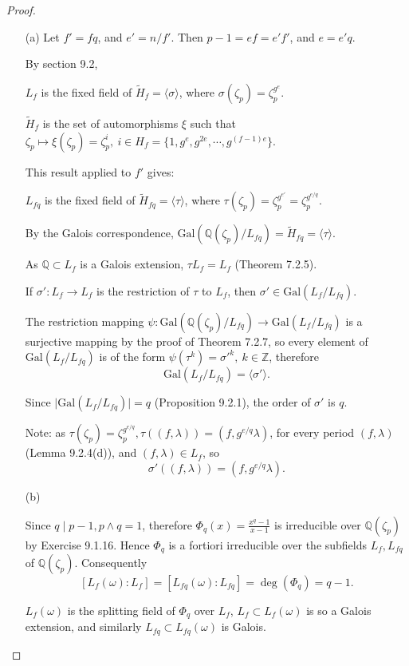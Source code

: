 \documentclass[11pt,a4paper]{article}
\newcommand{\Q}{\mathbb{Q}}
\newcommand{\Z}{\mathbb{Z}}
\newcommand{\Gal}{\mathrm{Gal}}
\begin{document}
\begin{proof}
\begin{enumerate}
\item[(a)]
Let $f' = fq$, and $e'=n/f'$. Then $p-1 = ef = e'f'$, and $e = e'q$.

By section 9.2, 
\begin{center}
$L_f$ is the fixed field of $\tilde{H}_f = \langle \sigma \rangle$, where $\sigma(\zeta_p ) = \zeta_p^{g^e}$.
\end{center}
$\tilde{H}_f$ is the set of automorphisms $\xi$ such that $\zeta_p \mapsto \xi(\zeta_p) =  \zeta_p^i,\   i \in H_f = \{1,g^e,g^{2e},\cdots,g^{(f-1)e}\}$.

This result applied to $f'$ gives:
\begin{center}
$L_{fq}$ is the fixed field of $\tilde{H}_{fq}= \langle \tau \rangle$, where  $\tau(\zeta_p ) = \zeta_p^{g^{e'}} = \zeta_p^{g^{e/q}}$.
\end{center}
By the Galois correspondence,  $\Gal(\Q(\zeta_p)/L_{fq}) =\tilde{H}_{fq} = \langle \tau \rangle$.

As $\Q \subset L_f$ is a Galois extension, $\tau L_f = L_f$ (Theorem 7.2.5).

 If $\sigma' : L_f \to L_f$ is the restriction of $\tau$ to  $L_f$, then $\sigma' \in \Gal(L_f/L_{fq})$.

The restriction mapping $\psi : \Gal(\Q(\zeta_p)/L_{fq}) \to \Gal(L_f/L_{fq})$ is a surjective mapping by the proof of Theorem 7.2.7, so every element of  $\Gal(L_f/L_{fq})$ is of the form $\psi(\tau^k) = \sigma'^k,\ k \in \Z$, therefore
$$\Gal(L_f/L_{fq}) = \langle \sigma' \rangle.$$

Since $\vert \Gal(L_f/L_{fq}) \vert = q$ (Proposition 9.2.1), the order of $\sigma'$ is $q$.

Note: as $\tau(\zeta_p )  = \zeta_p^{g^{e/q}}, \tau((f,\lambda)) = (f,g^{e/q} \lambda)$, for every period $(f,\lambda)$ (Lemma 9.2.4(d)), and $(f,\lambda) \in L_f$, so
$$\sigma'((f,\lambda)) = (f,g^{e/q} \lambda).$$


\item[(b)]

Since $q\mid p-1, p\wedge q = 1$, therefore $\Phi_q(x) = \frac{x^{q}-1}{x-1}$ is irreducible over $\Q(\zeta_p)$ by Exercise 9.1.16. Hence $\Phi_q$ is a fortiori irreducible over the subfields $L_f,L_{fq}$ of $\Q(\zeta_p)$.
Consequently $$[L_f(\omega):L_f] = [L_{fq}(\omega) : L_{fq}] = \deg(\Phi_q) =  q-1.$$
 
 $L_f(\omega)$ is the splitting field of $\Phi_q$ over $L_f$, $L_f \subset L_f(\omega)$ is so a Galois extension, and similarly $L_{fq} \subset L_{fq}(\omega)$ is Galois.
 

\end{enumerate}
\end{proof}
\end{document}
